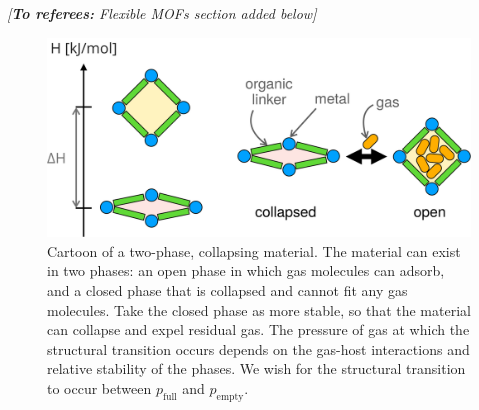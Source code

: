 \documentclass[twoside,twocolumn,9pt]{article}
\newcommand\startreferees[1]{\cbstart \noindent\textit{\color{red}%
[\textbf{To referees:} #1]}

}
\newcommand\pfull{\ensuremath{p_{\text{full}}}}
\newcommand\pempty{\ensuremath{p_{\text{empty}}}}
\begin{document}
\startreferees{Flexible MOFs section added below}
\begin{figure}
    \centering
    \includegraphics[width=0.95\columnwidth]{figs/two-phase}
    \caption{Cartoon of a two-phase, collapsing material. The material can exist in two phases: an open phase in which gas molecules can adsorb, and a closed phase that is collapsed and cannot fit any gas molecules. Take the closed phase as more stable, so that the material can collapse and expel residual gas.
    The pressure of gas at which the structural transition occurs depends on the gas-host interactions and relative stability of the phases. We wish for the structural transition to occur between $\pfull$ and $\pempty$.
    }
    \label{fig:flexible-cartoon}
\end{figure}
\end{document}
